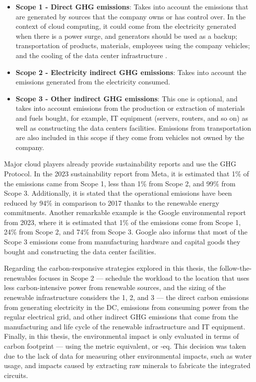 \begin{itemize}
\item \textbf{Scope 1 - Direct GHG emissions}: Takes into account the emissions that are generated by sources that the company owns or has control over. In the context of cloud computing, it could come from the electricity generated when there is a power surge, and generators should be used as a backup; transportation of products, materials, employees using the company vehicles; and the cooling of the data center infrastructure \cite{gupta2021_chasingcarbon}.
\item \textbf{Scope 2 - Electricity indirect GHG emissions}: Takes into account the emissions generated from the electricity consumed.
\item \textbf{Scope 3 - Other indirect GHG emissions}: This one is optional, and takes into account emissions from the production or extraction of materials and fuels bought, for example, IT equipment (servers, routers, and so on) as well as constructing the data centers facilities. Emissions from transportation are also included in this scope if they come from vehicles not owned by the company. 
\end{itemize}  

Major cloud players already provide sustainability reports and use the GHG Protocol. In the 2023 sustainability report from Meta\cite{meta_sustainability_report_2023}, it is estimated that 1\% of the emissions came from Scope 1, less than 1\% from Scope 2, and 99\% from Scope 3. Additionally, it is stated that the operational emissions have been reduced by 94\% in comparison to 2017 thanks to the renewable energy commitments. Another remarkable example is the Google environmental report from 2023\cite{google_sustainability_report_2023}, where it is estimated that 1\% of the emissions come from Scope 1, 24\% from Scope 2, and 74\% from Scope 3. Google also informs that most of the Scope 3 emissions come from manufacturing hardware and capital goods they bought and constructing the data center facilities.

Regarding the carbon-responsive strategies explored in this thesis, the follow-the-renewables focuses in Scope 2 --- schedule the workload to the location that uses less carbon-intensive power from renewable sources, and the sizing of the renewable infrastructure considers the  1, 2, and 3 --- the direct carbon emissions from generating electricity in the DC, emissions from consuming power from the regular electrical grid, and other indirect GHG emissions that come from the manufacturing and life cycle of the renewable infrastructure and IT equipment. Finally, in this thesis, the environmental impact is only evaluated in terms of carbon footprint --- using the metric  equivalent, or -eq. This decision was taken due to the lack of data for measuring other environmental impacts, such as water usage, and impacts caused by extracting raw minerals to fabricate the integrated circuits.

